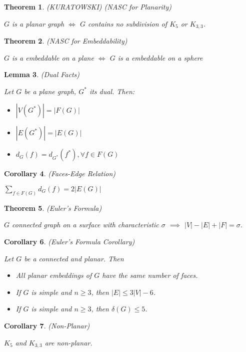 \documentclass[12pt]{amsart}
\newtheorem{thm}{Theorem}
\newtheorem{lem}[thm]{Lemma}
\newtheorem{cor}[thm]{Corollary}
\theoremstyle{definition}
\begin{document}
\begin{thm} (KURATOWSKI) (NASC for Planarity)

$G$ is a planar graph $\Longleftrightarrow$ $G$ contains no subdivision of $K_5$ or $K_{3,3}$.
\end{thm}


\begin{thm} (NASC for Embeddability)

$G$ is a embeddable on a plane $\Longleftrightarrow$ $G$ is a embeddable on a sphere
\end{thm}


\begin{lem} (Dual Facts)

Let $G$ be a plane graph, $G^*$ its dual. Then:
\begin{itemize}
  \item $|V(G^*)|=|F(G)|$
  \item $|E(G^*)|=|E(G)|$
  \item $d_G(f)=d_{G^*}(f^*), \forall f\in F(G)$
\end{itemize}

\end{lem}


\begin{cor} (Faces-Edge Relation)

$\sum_{f\in F(G)} d_G(f)=2|E(G)|$
\end{cor}


\begin{thm} (Euler's Formula)

$G$ connected graph on a surface with characteristic $\sigma$ $\implies$ $|V|-|E|+|F|=\sigma$.
\end{thm}


\begin{cor} (Euler's Formula Corollary)

Let $G$ be a connected and planar. Then
\begin{itemize}
  \item All planar embeddings of $G$ have the same number of faces.
  \item If $G$ is simple and $n\geq 3$, then $|E| \leq 3|V|-6$.
  \item If $G$ is simple and $n\geq 3$, then $\delta(G) \leq 5$.
\end{itemize}
\end{cor}


\begin{cor} (Non-Planar)

$K_5$ and $K_{3,3}$ are non-planar.
\end{cor}
\end{document}

